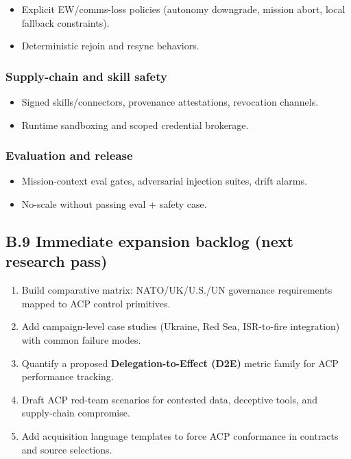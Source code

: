 \documentclass[
]{article}
\providecommand{\tightlist}{%
  \setlength{\itemsep}{0pt}\setlength{\parskip}{0pt}}
\begin{document}
\begin{itemize}
\tightlist
\item
  Explicit EW/comms-loss policies (autonomy downgrade, mission abort,
  local fallback constraints).
\item
  Deterministic rejoin and resync behaviors.
\end{itemize}

\hypertarget{supply-chain-and-skill-safety}{%
\subsubsection{Supply-chain and skill
safety}\label{supply-chain-and-skill-safety}}

\begin{itemize}
\tightlist
\item
  Signed skills/connectors, provenance attestations, revocation
  channels.
\item
  Runtime sandboxing and scoped credential brokerage.
\end{itemize}

\hypertarget{evaluation-and-release}{%
\subsubsection{Evaluation and release}\label{evaluation-and-release}}

\begin{itemize}
\tightlist
\item
  Mission-context eval gates, adversarial injection suites, drift
  alarms.
\item
  No-scale without passing eval + safety case.
\end{itemize}

\hypertarget{b.9-immediate-expansion-backlog-next-research-pass}{%
\subsection{B.9 Immediate expansion backlog (next research
pass)}\label{b.9-immediate-expansion-backlog-next-research-pass}}

\begin{enumerate}
\def\labelenumi{\arabic{enumi}.}
\tightlist
\item
  Build comparative matrix: NATO/UK/U.S./UN governance requirements
  mapped to ACP control primitives.
\item
  Add campaign-level case studies (Ukraine, Red Sea, ISR-to-fire
  integration) with common failure modes.
\item
  Quantify a proposed \textbf{Delegation-to-Effect (D2E)} metric family
  for ACP performance tracking.
\item
  Draft ACP red-team scenarios for contested data, deceptive tools, and
  supply-chain compromise.
\item
  Add acquisition language templates to force ACP conformance in
  contracts and source selections.
\end{enumerate}
\end{document}

